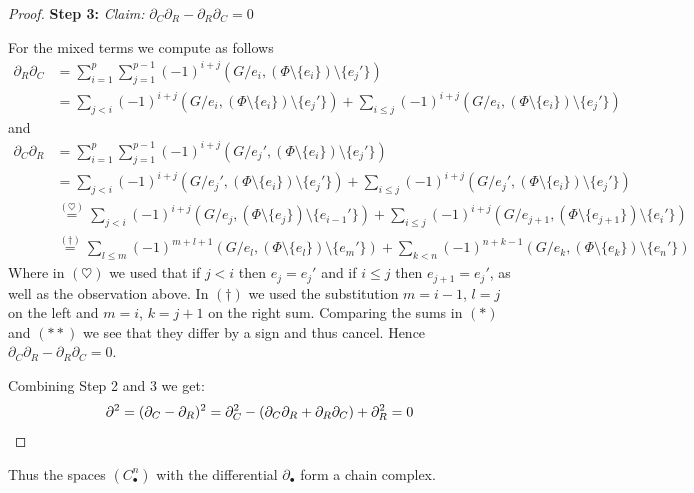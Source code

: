 \begin{proof}
	\textbf{Step 3:} \emph{Claim:} $\partial_{C} \partial_{R} - \partial_{R} \partial_{C} = 0$

	For the mixed terms we compute as follows
	\begin{align*}
		\partial_{R} \partial_{C} &=  \sum_{i=1}^{p} \sum_{j=1}^{p-1} (-1)^{i+j}(G / e_{i}, (\Phi \setminus \{e_{i}\} ) \setminus \{e_{j}'\})  \\
					   &= \sum_{j < i} (-1)^{i+j} (G / e_{i}, (\Phi \setminus \{e_{i}\} ) \setminus \{e_{j}'\}) + \sum_{i \leq j} (-1)^{i+j}
					   (G / e_{i}, (\Phi \setminus \{e_{i}\} ) \setminus \{e_{j}'\}) \tag{$*$}
	\end{align*}
	and
	\begin{align*}
		\partial_{C} \partial_{R} &=  \sum_{i=1}^{p} \sum_{j=1}^{p-1} (-1)^{i+j}(G / e_{j}', (\Phi \setminus \{e_{i}\} ) \setminus \{e_{j}'\})  \\
					   &= \sum_{j < i} (-1)^{i+j} (G / e_{j}', (\Phi \setminus \{e_{i}\} ) \setminus \{e_{j}'\}) + \sum_{i \leq j} (-1)^{i+j}
					   (G / e_{j}', (\Phi \setminus \{e_{i}\} ) \setminus \{e_{j}'\}) \\
					   &\stackrel{(\heartsuit)}{=} \sum_{j < i} (-1)^{i+j} (G / e_{j}, (\Phi \setminus \{e_{j}\} ) \setminus \{e_{i-1}'\}) + \sum_{i \leq j} (-1)^{i+j}
					   (G / e_{j+1}, (\Phi \setminus \{e_{j+1}\} ) \setminus \{e_{i}'\}) \\
					   &\stackrel{(\dagger)}{=} \sum_{l \leq m} (-1)^{m+l+1} (G / e_{l}, (\Phi \setminus \{e_{l}\} ) \setminus \{e_{m}'\}) + \sum_{k < n} (-1)^{n+k-1}
					   (G / e_{k}, (\Phi \setminus \{e_{k}\} ) \setminus \{e_{n}'\}) \tag{$* *$}
	\end{align*}
	Where in $(\heartsuit)$ we used that if $j < i$ then $e_{j} = e_{j}'$ and if $i \leq j$ then $e_{j+1} = e_{j}'$, as well as the observation above.
	In $(\dagger)$ we used the substitution  $m = i-1$,  $l = j$ on the left and  $m = i$,  $k = j+1$ on the right sum.
	Comparing the sums in $(*)$ and $(* *)$ we see that they differ by a sign and thus cancel. Hence  $\partial_{C} \partial_{R} - \partial_{R} \partial_{C} = 0$.

	Combining Step 2 and 3 we get:
	\[
		\partial^2 = (\partial_{C} - \partial_{R})^2 = \partial_{C}^2 - (\partial_{C} \partial_{R} + \partial_{R} \partial_{C}) + \partial_{R}^2 = 0\qedhere
	\]
\end{proof}

Thus the spaces $(C^{n}_{\bullet})$ with the differential $\partial_{\bullet}$ form a chain complex.

